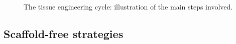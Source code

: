 \begin{figure}
\caption{The tissue engineering cycle: illustration of the main steps involved.}
\label{fig1d1}
\end{figure}


\subsection{Scaffold-free strategies}

